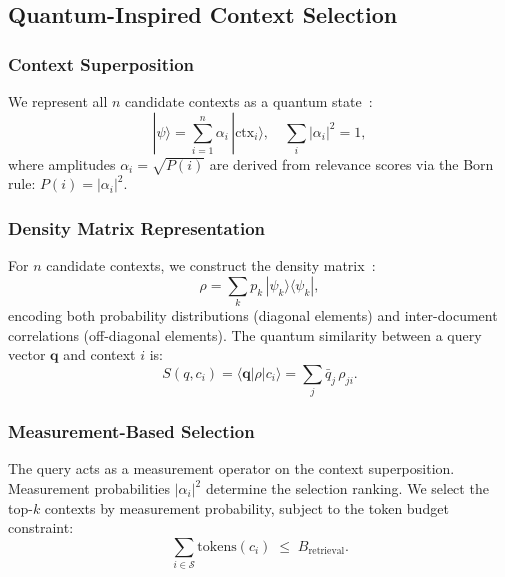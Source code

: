 \documentclass[11pt,a4paper]{article}
\newcommand{\abs}[1]{\left|#1\right|}
\newcommand{\ket}[1]{|#1\rangle}
\newcommand{\bra}[1]{\langle #1|}
\begin{document}
\subsection{Quantum-Inspired Context Selection}
\label{sec:quantum}

\subsubsection{Context Superposition}

We represent all $n$ candidate contexts as a quantum
state~\cite{vanrijsbergen2004}:
\begin{equation}
  \ket{\psi} = \sum_{i=1}^{n} \alpha_i\, \ket{\mathrm{ctx}_i},
  \quad
  \sum_{i} \abs{\alpha_i}^{2} = 1,
  \label{eq:superposition}
\end{equation}
where amplitudes $\alpha_i = \sqrt{P(i)}$ are derived from relevance scores
via the Born rule: $P(i) = \abs{\alpha_i}^{2}$.

\subsubsection{Density Matrix Representation}

For $n$ candidate contexts, we construct the density
matrix~\cite{zuccon2009}:
\begin{equation}
  \rho = \sum_{k} p_k\, \ket{\psi_k}\bra{\psi_k},
  \label{eq:density}
\end{equation}
encoding both probability distributions (diagonal elements) and
inter-document correlations (off-diagonal elements).  The quantum
similarity between a query vector $\mathbf{q}$ and context $i$ is:
\begin{equation}
  S(q, c_i) = \bra{\mathbf{q}}\rho\ket{c_i}
            = \sum_{j} \bar{q}_j\, \rho_{ji}.
  \label{eq:qsim}
\end{equation}

\subsubsection{Measurement-Based Selection}

The query acts as a measurement operator on the context superposition.
Measurement probabilities $\abs{\alpha_i}^{2}$ determine the selection
ranking.  We select the top-$k$ contexts by measurement probability,
subject to the token budget constraint:
\begin{equation}
  \sum_{i \in \mathcal{S}}
    \mathrm{tokens}(c_i) \;\leq\; B_{\mathrm{retrieval}}.
  \label{eq:budget-constraint}
\end{equation}
\end{document}
